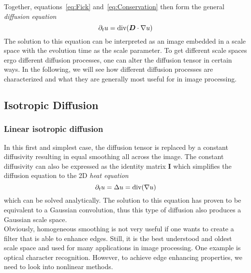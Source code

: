 \noindent Together, equations~\eqref{eq:Fick} and~\eqref{eq:Conservation} then form the general \textit{diffusion
    equation}~\cite{dic, weickert96}
\begin{equation}
    \partial_t u = \textnormal{div}(\boldsymbol D\cdot\mathbf{\nabla} u)\label{eq:Diffusion}
\end{equation}
The solution to this equation can be interpreted as an image embedded in a scale space with the
evolution time as the scale parameter. To get different scale spaces ergo different diffusion
processes, one can alter the diffusion tensor in certain ways.
In the following, we will see how different diffusion processes are characterized and what they are
generally most useful for in image processing.

\subsection{Isotropic Diffusion}
\subsubsection*{Linear isotropic diffusion}
In this first and simplest case, the diffusion tensor is replaced by a constant diffusivity
resulting in equal smoothing all across the image. The constant diffusivity can also be expressed
as the identity matrix $\boldsymbol I$ which simplifies the diffusion equation to the 2D\textit{
heat equation}
\begin{equation}
    \partial_t u = \Delta u = \textnormal{div}(\mathbf{\nabla} u)\label{eq:IsoDiff}
\end{equation}
which can be solved analytically. The solution to this equation has proven to be equivalent to
a Gaussian convolution, thus this type of diffusion also produces a Gaussian scale space.\\
Obviously, homogeneous smoothing is not very useful if one wants to create a filter that is able to
enhance edges. Still, it is the best understood and oldest scale space and used for many
applications in image processing. One example is optical character recognition.
However, to achieve edge enhancing properties, we need to look into nonlinear methods.

